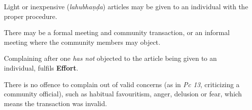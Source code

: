 Light or inexpensive (\emph{lahubhaṇḍa}) articles may be given to an
individual with the proper procedure.

There may be a formal meeting and community transaction, or an informal
meeting where the community members may object.

Complaining after one \emph{has not} objected to the article being given
to an individual, fulfils \textbf{Effort}.

There is no offence to complain out of valid concerns (as in \emph{Pc
13}, criticizing a community official), such as habitual favouritism,
anger, delusion or fear, which means the transaction was invalid.

